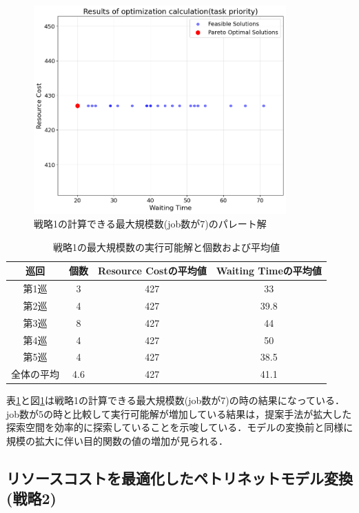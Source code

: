 \begin{figure}[H]
    \centering
    \includegraphics[width=0.8\linewidth, height=8cm]{./images/task_job7.png}
    \caption{戦略1の計算できる最大規模数(job数が7)のパレート解}
    \label{fig:fig7}
\end{figure}
\clearpage

\begin{table}[ht]
    \centering
    \vspace{-0.3cm}
    \caption{戦略1の最大規模数の実行可能解と個数および平均値}
    \begin{tabular}{|c|c|c|c|}
        \hline
         巡回 & 個数 & Resource Costの平均値 & Waiting Timeの平均値 \\
        \hline
        第1巡 & 3 & 427 & 33 \\
        \hline
        第2巡 & 4 & 427 & 39.8 \\
        \hline
        第3巡 & 8 & 427 & 44 \\
        \hline
        第4巡 & 4 & 427 & 50 \\
        \hline
        第5巡 & 4 & 427 & 38.5 \\
        \hline
        全体の平均 & 4.6 & 427 & 41.1 \\
        \hline
    \end{tabular}
    \label{tab:task_feasible_max}
\end{table}

表\ref{tab:task_feasible_max}と図\ref{fig:fig7}は戦略1の計算できる最大規模数(job数が7)の時の結果になっている．job数が5の時と比較して実行可能解が増加している結果は，提案手法が拡大した探索空間を効率的に探索していることを示唆している．モデルの変換前と同様に規模の拡大に伴い目的関数の値の増加が見られる．
 
\subsection{リソースコストを最適化したペトリネットモデル変換(戦略2)}

